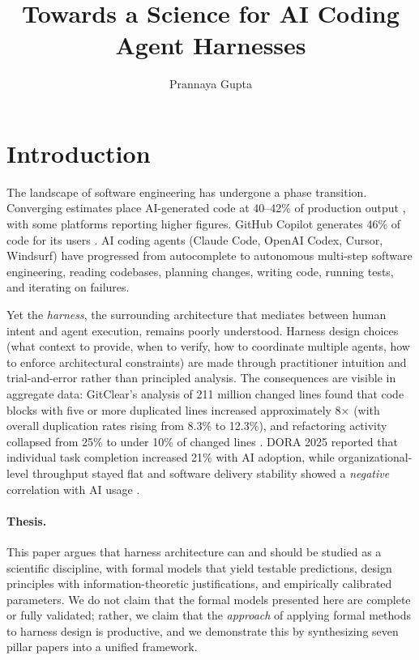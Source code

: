 \documentclass[11pt, a4paper, logo, copyright]{googledeepmind}
\title{Towards a Science for AI Coding Agent Harnesses}
\author[1]{Prannaya Gupta}
\affil[1]{Pragnition Labs}
\begin{document}
\maketitle

\section{Introduction}
\label{sec:intro}

The landscape of software engineering has undergone a phase transition. Converging estimates place AI-generated code at 40--42\% of production output \citep{gitclear2025, sonar2026}, with some platforms reporting higher figures. GitHub Copilot generates 46\% of code for its users \citep{github2024rct}. AI coding agents (Claude Code, OpenAI Codex, Cursor, Windsurf) have progressed from autocomplete to autonomous multi-step software engineering, reading codebases, planning changes, writing code, running tests, and iterating on failures.

Yet the \emph{harness}, the surrounding architecture that mediates between human intent and agent execution, remains poorly understood. Harness design choices (what context to provide, when to verify, how to coordinate multiple agents, how to enforce architectural constraints) are made through practitioner intuition and trial-and-error rather than principled analysis. The consequences are visible in aggregate data: GitClear's analysis of 211 million changed lines found that code blocks with five or more duplicated lines increased approximately 8$\times$ (with overall duplication rates rising from 8.3\% to 12.3\%), and refactoring activity collapsed from 25\% to under 10\% of changed lines \citep{gitclear2025}. DORA 2025 reported that individual task completion increased 21\% with AI adoption, while organizational-level throughput stayed flat and software delivery stability showed a \emph{negative} correlation with AI usage \citep{dora2025}.

\paragraph{Thesis.} This paper argues that harness architecture can and should be studied as a scientific discipline, with formal models that yield testable predictions, design principles with information-theoretic justifications, and empirically calibrated parameters. We do not claim that the formal models presented here are complete or fully validated; rather, we claim that the \emph{approach} of applying formal methods to harness design is productive, and we demonstrate this by synthesizing seven pillar papers into a unified framework.
\end{document}
